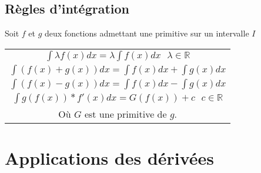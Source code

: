 \documentclass[12pt, a4paper]{book}
\begin{document}
\subsection{Règles d'intégration}
Soit $f$ et $g$ deux fonctions admettant une primitive sur un intervalle $I$
\begin{center}
    \begin{tabular}{|c|}
        \hline
        $\int \lambda f(x)dx = \lambda \int f(x)dx \ \ \ \lambda \in \mathbb{R}$\\
        $\int (f(x)+g(x))dx = \int f(x)dx + \int g(x)dx $\\
        $\int (f(x)-g(x))dx = \int f(x)dx - \int g(x)dx $\\
        $\int g(f(x))*f'(x)dx = G(f(x)) + c \ \ \ c \in \mathbb{R}$\\
        Où $G$ est une primitive de $g$.\\
        \hline
    \end{tabular}
\end{center}
\newpage
\section{Applications des dérivées}
\end{document}
